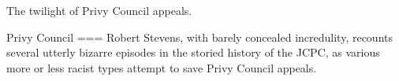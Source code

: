 The twilight of Privy Council appeals.

Privy Council
===
Robert Stevens, with barely concealed incredulity, recounts several utterly bizarre episodes in the storied history of the JCPC, as various more or less racist types attempt to save Privy Council appeals.
\nocite{stevens1997}